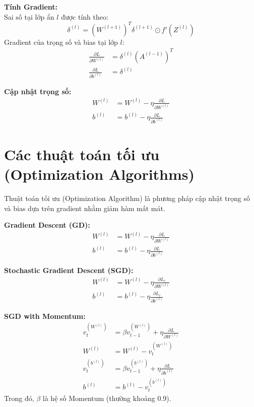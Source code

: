 \documentclass[12pt,a4paper]{report}
\begin{document}
\textbf{Tính Gradient:} \\
Sai số tại lớp ẩn $l$ được tính theo:
\begin{equation}
    \delta^{(l)} = (W^{(l+1)})^T \delta^{(l+1)} \odot f'(Z^{(l)})
\end{equation}
Gradient của trọng số và bias tại lớp $l$:
\begin{align}
    \frac{\partial L}{\partial W^{(l)}} &= \delta^{(l)} (A^{(l-1)})^T \\
    \frac{\partial L}{\partial b^{(l)}} &= \delta^{(l)}
\end{align}

\textbf{Cập nhật trọng số:}
\begin{align}
    W^{(l)} &= W^{(l)} - \eta \frac{\partial L}{\partial W^{(l)}} \\
    b^{(l)} &= b^{(l)} - \eta \frac{\partial L}{\partial b^{(l)}}
\end{align}

\section{Các thuật toán tối ưu (Optimization Algorithms)}
Thuật toán tối ưu (Optimization Algorithm) là phương pháp cập nhật trọng số và bias dựa trên gradient nhằm giảm hàm mất mát.

\textbf{Gradient Descent (GD):}
\begin{align}
    W^{(l)} &= W^{(l)} - \eta \frac{\partial L}{\partial W^{(l)}} \\
    b^{(l)} &= b^{(l)} - \eta \frac{\partial L}{\partial b^{(l)}}
\end{align}

\textbf{Stochastic Gradient Descent (SGD):}
\begin{align}
    W^{(l)} &= W^{(l)} - \eta \frac{\partial L_i}{\partial W^{(l)}} \\
    b^{(l)} &= b^{(l)} - \eta \frac{\partial L_i}{\partial b^{(l)}}
\end{align}

\textbf{SGD with Momentum:}
\begin{align}
    v_t^{(W^{(l)})} &= \beta v_{t-1}^{(W^{(l)})} + \eta \frac{\partial L}{\partial W^{(l)}} \\
    W^{(l)} &= W^{(l)} - v_t^{(W^{(l)})} \\
    v_t^{(b^{(l)})} &= \beta v_{t-1}^{(b^{(l)})} + \eta \frac{\partial L}{\partial b^{(l)}} \\
    b^{(l)} &= b^{(l)} - v_t^{(b^{(l)})}
\end{align}
Trong đó, $\beta$ là hệ số Momentum (thường khoảng 0.9).
\end{document}
